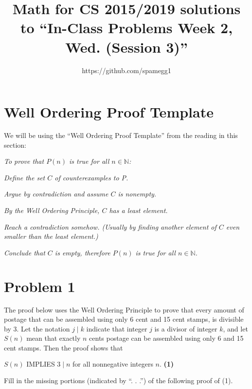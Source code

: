 \documentclass[14pt]{extarticle}
\title{Math for CS 2015/2019 solutions to ``In-Class Problems Week 2, Wed. (Session 3)''}
\author{https://github.com/spamegg1}
\begin{document}
\maketitle
\tableofcontents

\section{Well Ordering Proof Template}

We will be using the ``Well Ordering Proof Template'' from the reading in this section:

\textit{To prove that $P(n)$ is true for all $n \in \mathbb{N}$:}

\textit{Define the set $C$ of counterexamples to P.}

\textit{Argue by contradiction and assume $C$ is nonempty.}

\textit{By the Well Ordering Principle, $C$ has a least element.}

\textit{Reach a contradiction somehow. (Usually by finding another element of $C$ even smaller than the least element.)}

\textit{Conclude that $C$ is empty, therefore $P(n)$ is true for all $n \in \mathbb{N}$.}

\section{Problem 1}
The proof below uses the Well Ordering Principle to prove that every amount of postage that can be assembled using only 6 cent and 15 cent stamps, is divisible by 3. Let the notation $j \mid k$ indicate that integer $j$ is a divisor of integer $k$, and let $S(n)$ mean that exactly $n$ cents postage can be assembled using only 6 and 15 cent stamps. Then the proof shows that 

$S(n)$ IMPLIES $3 \mid n$ for all nonnegative integers $n$. {\bf (1)}

Fill in the missing portions (indicated by “. . .”) of the following proof of (1).
\end{document}
